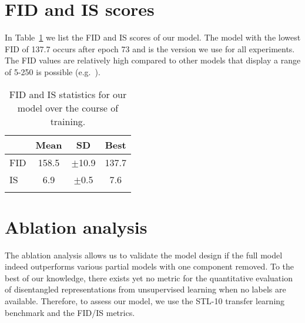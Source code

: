 \documentclass[a4paper,12pt]{report}
\begin{document}
\section{FID and IS scores}\label{sec:fid_is_scores}
In Table~\ref{tab:fid_is_stats} we list the FID and IS scores of our model. The model with the lowest FID of 137.7 occurs after epoch 73 and is the version we use for all experiments. The FID values are relatively high compared to other models that display a range of 5-250 is possible (e.g.\ \cite{StyleGAN, TTUR, SAGAN, SNGAN}).
\begin{table}[ht!]
\centering
\begin{tabular}{l|c|c|c}
\Xhline{0.8pt}
 & \textbf{Mean} & \textbf{SD} & \textbf{Best} \\
\hline
FID & 158.5 & $\pm$10.9 & 137.7\\
\hline
IS & 6.9 & $\pm$0.5 & 7.6\\
\Xhline{0.8pt}
\end{tabular}
\caption{FID and IS statistics for our model over the course of training.} 
\label{tab:fid_is_stats}
\end{table}


\section{Ablation analysis}
The ablation analysis allows us to validate the model design if the full model indeed outperforms various partial models with one component removed. To the best of our knowledge, there exists yet no metric for the quantitative evaluation of disentangled representations from unsupervised learning when no labels are available. Therefore, to assess our model, we use the STL-10 transfer learning benchmark and the FID/IS metrics.
\end{document}
